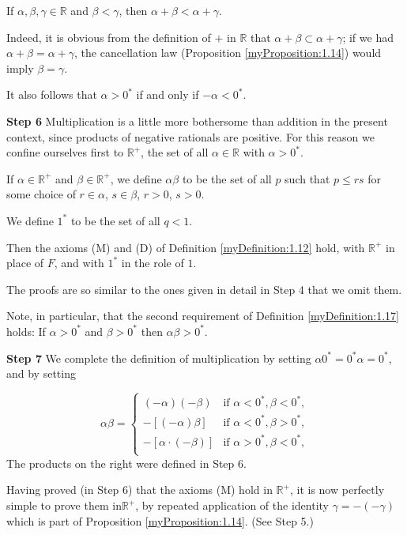 If $\alpha, \beta, \gamma \in \mathbb{R}$ and $\beta < \gamma$, then $\alpha + \beta < \alpha + \gamma$.

Indeed, it is obvious from the definition of $+$ in $\mathbb{R}$ that $\alpha + \beta \subset \alpha + \gamma$; if we had $\alpha + \beta = \alpha + \gamma$, the cancellation law (Proposition \ref{myProposition:1.14}) would imply $\beta = \gamma$.

It also follows that $\alpha > 0^*$ if and only if $-\alpha < 0^*$.

\textbf{Step 6} Multiplication is a little more bothersome than addition in the present context, since products of negative rationals are positive. For this reason we confine ourselves first to $\mathbb{R}^+$, the set of all $\alpha \in \mathbb{R}$ with $\alpha > 0^*$.

If $\alpha \in \mathbb{R}^+$ and $\beta \in \mathbb{R}^+$, we define $\alpha\beta$ to be the set of all $p$ such that $p \leq rs$
for some choice of $r \in \alpha$, $s \in \beta$, $r>0$, $s>0$.

We define $1^*$ to be the set of all $q < 1$.


Then the axioms (M) and (D) of Definition \ref{myDefinition:1.12} hold, with $\mathbb{R}^+$ in place of $F$, and with $1^*$ in the role of $1$.

The proofs are so similar to the ones given in detail in Step 4 that we omit
them.

Note, in particular, that the second requirement of Definition \ref{myDefinition:1.17} holds:
If $\alpha > 0^*$ and $\beta > 0^*$ then $\alpha\beta > 0^*$.

\textbf{Step 7} We complete the definition of multiplication by setting $\alpha 0^* = 0^* \alpha = 0^*$,
and by setting

\begin{equation*}
    \alpha\beta = \left\{
        \begin{array}{ll}
            (-\alpha)(-\beta) & \text{if } \alpha < 0^*, \beta < 0^*,\\
            -[(-\alpha)\beta] & \text{if } \alpha < 0^*, \beta > 0^*,\\
            -[\alpha\cdot(-\beta)] & \text{if } \alpha > 0^*, \beta < 0^*,\\
        \end{array}
    \right.
\end{equation*}
The products on the right were defined in Step 6.

Having proved (in Step 6) that the axioms (M) hold in $\mathbb{R}^+$, it is now
perfectly simple to prove them in$\mathbb{\mathbb{R}^+}$, by repeated application of the identity $\gamma = -(-\gamma)$ which is part of Proposition \ref{myProposition:1.14}. (See Step 5.)

